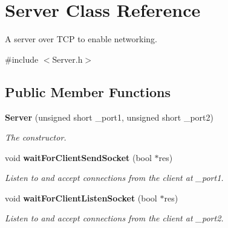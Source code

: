 \section{Server Class Reference}
\label{classServer}


A server over T\+CP to enable networking.  




{\ttfamily \#include $<$Server.\+h$>$}

\subsection*{Public Member Functions}
\begin{DoxyCompactItemize}
\item 
{\bf Server} (unsigned short \+\_\+port1, unsigned short \+\_\+port2)
\begin{DoxyCompactList}\small\item\em The constructor. \end{DoxyCompactList}\item 
void {\bf wait\+For\+Client\+Send\+Socket} (bool $\ast$res)
\begin{DoxyCompactList}\small\item\em Listen to and accept connections from the client at \+\_\+port1. \end{DoxyCompactList}\item 
void {\bf wait\+For\+Client\+Listen\+Socket} (bool $\ast$res)
\begin{DoxyCompactList}\small\item\em Listen to and accept connections from the client at \+\_\+port2. \end{DoxyCompactList}\end{DoxyCompactItemize}
